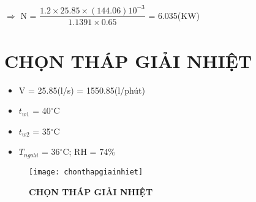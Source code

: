 $\Rightarrow$ N = $\dfrac{1.2 \times 25.85 \times (144.06)10^{-3}}{1.1391 \times 0.65}$ = 6.035(KW)

\section{CHỌN THÁP GIẢI NHIỆT}
\begin{itemize}
	\item V = 25.85(l/s) = 1550.85(l/phút)
	\item $t_{w1}$ = 40$^{\circ}$C
	\item $t_{w2}$ = 35$^{\circ}$C
	\item $T_{ngoài}$ = 36$^{\circ}$C; RH = 74\%
\end{itemize}

\newpage
\begin{figure}[H]
	\centering
	\texttt{[image: chonthapgiainhiet]}
	\caption{\textbf{CHỌN THÁP GIẢI NHIỆT}}
	\label{chonthapgiainhiet}
\end{figure}
